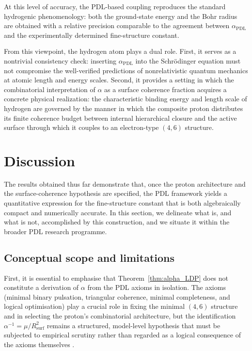 \documentclass[11pt,a4paper]{article}
\theoremstyle{plain}
\theoremstyle{definition}
\theoremstyle{remark}
\begin{document}
At this level of accuracy, the PDL-based coupling reproduces the standard hydrogenic phenomenology: both the ground-state energy and the Bohr radius are obtained with a relative precision comparable to the agreement between
\(\alpha_{\mathrm{PDL}}\) and the experimentally determined fine-structure constant.

From this viewpoint, the hydrogen atom plays a dual role. First, it serves as a nontrivial consistency check: inserting \(\alpha_{\mathrm{PDL}}\) into the Schrödinger equation must not compromise the well-verified predictions of nonrelativistic quantum mechanics at atomic length and energy scales. Second, it provides a setting in which the combinatorial interpretation of \(\alpha\) as a surface coherence fraction acquires a concrete physical realization: the characteristic binding energy and length scale of hydrogen are governed by the manner in which the composite proton distributes its finite coherence budget between internal hierarchical closure and the active surface through which it couples to an electron-type \((4,6)\) structure.

\section{Discussion}

The results obtained thus far demonstrate that, once the proton architecture and the surface-coherence hypothesis are specified, the PDL framework yields a quantitative expression for the fine-structure constant that is both algebraically compact and numerically accurate. In this section, we delineate what is, and what is not, accomplished by this construction, and we situate it within the broader PDL research programme.

\subsection{Conceptual scope and limitations}

First, it is essential to emphasise that Theorem~\ref{thm:alpha_LDP} does not constitute a derivation of \(\alpha\) from the PDL axioms in isolation. The axioms (minimal binary pulsation, triangular coherence, minimal completeness, and logical optimisation) play a crucial role in fixing the minimal \((4,6)\) structure and in selecting the proton’s combinatorial architecture, but the identification \(\alpha^{-1} = \mu / R_{\mathrm{surf}}^2\) remains a structured, model-level hypothesis that must be subjected to empirical scrutiny rather than regarded as a logical consequence of the axioms themselves \cite{Laubscher2026IntroPDL,Laubscher2026PDL_English,Laubscher2026LDP_French}.
\end{document}

